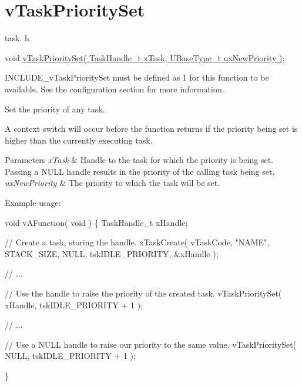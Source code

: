 \hypertarget{group__vTaskPrioritySet}{}\section{v\+Task\+Priority\+Set}
\label{group__vTaskPrioritySet}
task. h 
\begin{DoxyPre}void \hyperlink{task_8h_a1ee31be76e326e0644dbd6ac40a787b6}{vTaskPrioritySet( TaskHandle\_t xTask, UBaseType\_t uxNewPriority )};\end{DoxyPre}


I\+N\+C\+L\+U\+D\+E\+\_\+v\+Task\+Priority\+Set must be defined as 1 for this function to be available. See the configuration section for more information.

Set the priority of any task.

A context switch will occur before the function returns if the priority being set is higher than the currently executing task.


\begin{DoxyParams}{Parameters}
{\em x\+Task} & Handle to the task for which the priority is being set. Passing a N\+U\+LL handle results in the priority of the calling task being set.\\
\hline
{\em ux\+New\+Priority} & The priority to which the task will be set.\\
\hline
\end{DoxyParams}
Example usage\+: 
\begin{DoxyPre}
void vAFunction( void )
\{
TaskHandle\_t xHandle;
\begin{DoxyVerb}// Create a task, storing the handle.
xTaskCreate( vTaskCode, "NAME", STACK_SIZE, NULL, tskIDLE_PRIORITY, &xHandle );

// ...

// Use the handle to raise the priority of the created task.
vTaskPrioritySet( xHandle, tskIDLE_PRIORITY + 1 );

// ...

// Use a NULL handle to raise our priority to the same value.
vTaskPrioritySet( NULL, tskIDLE_PRIORITY + 1 );
\end{DoxyVerb}

\}
  \end{DoxyPre}
 